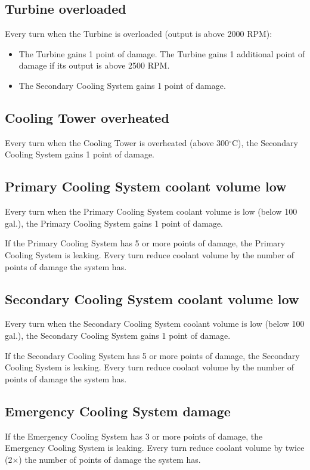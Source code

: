 \documentclass{article}
\begin{document}
\subsection{Turbine overloaded}

Every turn when the Turbine is overloaded (output is above 2000 RPM):
\begin{itemize}
\item The Turbine gains 1 point of damage.  The Turbine gains 1 additional point of damage if its output is above 2500 RPM.
\item The Secondary Cooling System gains 1 point of damage.
\end{itemize}

\subsection{Cooling Tower overheated}

Every turn when the Cooling Tower is overheated (above 300$^{\circ}$C), the Secondary Cooling System gains 1 point of damage.

\subsection{Primary Cooling System coolant volume low}

Every turn when the Primary Cooling System coolant volume is low (below 100 gal.), the Primary Cooling System gains 1 point of damage.

If the Primary Cooling System has 5 or more points of damage, the Primary Cooling System is leaking.  Every turn reduce coolant volume by the number of points of damage the system has.

\subsection{Secondary Cooling System coolant volume low}

Every turn when the Secondary Cooling System coolant volume is low (below 100 gal.), the Secondary Cooling System gains 1 point of damage.

If the Secondary Cooling System has 5 or more points of damage, the Secondary Cooling System is leaking.  Every turn reduce coolant volume by the number of points of damage the system has.

\subsection{Emergency Cooling System damage}

If the Emergency Cooling System has 3 or more points of damage, the Emergency Cooling System is leaking.  Every turn reduce coolant volume by twice (2$\times$) the number of points of damage the system has.
\end{document}
